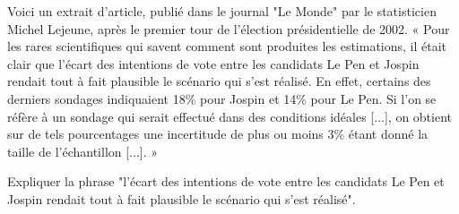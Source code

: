 
Voici un extrait d'article, publié dans le journal "Le Monde" par le statisticien Michel Lejeune, après le premier tour de l'élection présidentielle de 2002.
« Pour les rares scientifiques qui savent comment sont produites les estimations, il était clair que l'écart des intentions de vote entre les candidats Le Pen et Jospin rendait tout à fait plausible le scénario qui s'est réalisé. En effet, certains des derniers sondages indiquaient 18\% pour Jospin et 14\% pour Le Pen. Si l'on se réfère à un sondage qui serait effectué dans des conditions idéales [...], on obtient sur de tels pourcentages une incertitude de plus ou moins 3\% étant donné la taille de l'échantillon [...]. »

Expliquer la phrase "l'écart des intentions de vote entre les candidats Le Pen et Jospin rendait tout à fait plausible le scénario qui s'est réalisé".

